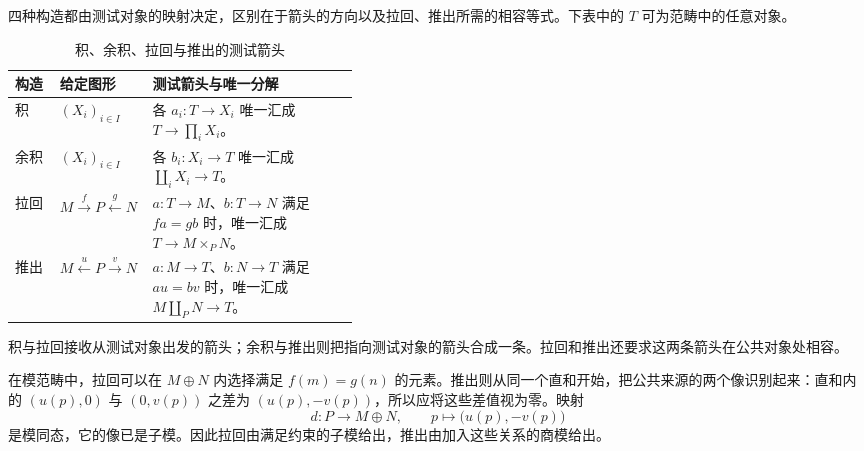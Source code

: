 四种构造都由测试对象的映射决定，区别在于箭头的方向以及拉回、推出所需的相容等式。下表中的 \(T\) 可为范畴中的任意对象。
\begin{table}[htbp]
	\centering
	\caption[积、余积、拉回与推出]{积、余积、拉回与推出的测试箭头}\label{b2:tab:universal-constructions}
	\begin{tabularx}{\linewidth}{@{}p{0.13\linewidth}p{0.27\linewidth}X@{}}
		\toprule
		构造 & 给定图形 & 测试箭头与唯一分解 \\
		\midrule
		积 & \((X_i)_{i\in I}\) & 各 \(a_i:T\to X_i\) 唯一汇成 \(T\to\prod_iX_i\)。 \\
		余积 & \((X_i)_{i\in I}\) & 各 \(b_i:X_i\to T\) 唯一汇成 \(\coprod_iX_i\to T\)。 \\
		拉回 & \(M\xrightarrow{f}P\xleftarrow{g}N\) & \(a:T\to M\)、\(b:T\to N\) 满足 \(fa=gb\) 时，唯一汇成 \(T\to M\times_PN\)。 \\
		推出 & \(M\xleftarrow{u}P\xrightarrow{v}N\) & \(a:M\to T\)、\(b:N\to T\) 满足 \(au=bv\) 时，唯一汇成 \(M\amalg_PN\to T\)。 \\
		\bottomrule
	\end{tabularx}
\end{table}
积与拉回接收从测试对象出发的箭头；余积与推出则把指向测试对象的箭头合成一条。拉回和推出还要求这两条箭头在公共对象处相容。

\ProseParagraphBreak
在模范畴中，拉回可以在 \(M\oplus N\) 内选择满足 \(f(m)=g(n)\) 的元素。推出则从同一个直和开始，把公共来源的两个像识别起来：直和内的 \((u(p),0)\) 与 \((0,v(p))\) 之差为 \((u(p),-v(p))\)，所以应将这些差值视为零。映射
\[
	d:P\longrightarrow M\oplus N,\qquad p\longmapsto\bigl(u(p),-v(p)\bigr)
\]
是模同态，它的像已是子模。因此拉回由满足约束的子模给出，推出由加入这些关系的商模给出。

